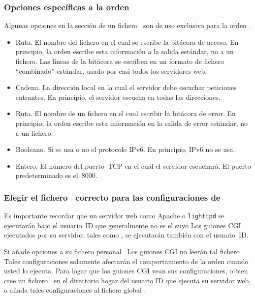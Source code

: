 \subsubsection{Opciones específicas a la orden }

Algunas opciones en la sección  de un fichero \hgrc\
son de uso exclusivo para la orden .
\begin{itemize}
\item[\rcitem{web}{accesslog}] Ruta.  El nombre del fichero en el cual
  se escribe la bitácora de acceso.  En principio, la orden
   escribe esta información a la salida estándar, no a un
  fichero. Las líneas de la bitácora se escriben en un formato de
  fichero ``combinado'' estándar, usado por casi todos los servidores
  web.
\item[\rcitem{web}{address}] Cadena.  La dirección local en la cual el
  servidor debe escuchar peticiones entrantes.  En principio, el
  servidor escucha en todas las direcciones.
\item[\rcitem{web}{errorlog}] Ruta.  El nombre de un fichero en el
  cual escribir la bitácora de error.  En principio, la orden
   escribe esta información en la salida de error
  estándar, no a un fichero.
\item[\rcitem{web}{ipv6}] Booleano.  Si se usa o no el protocolo
  IPv6. En principio, IPv6 no se usa.
\item[\rcitem{web}{port}] Entero.  El número del puerto~TCP en el cuál
  el servidor escuchará.  El puerto predeterminado es el~8000.
\end{itemize}

\subsubsection{Elegir el fichero \hgrc\ correcto para las
  configuraciones de }

Es importante recordar que un servidor web como Apache o
\texttt{lighttpd} se ejecutarán bajo el usuario~ID que generalmente no
es el suyo  Los guiones CGI ejecutados por su servidor, tales como
\sfilename{hgweb.cgi}, se ejecutarán también con el usuario~ID.

Si añade opciones  a su fichero personal \hgrc\, Los
guiones CGI no leerán tal fichero \hgrc\.  Tales configuraciones
solamente afectarán el comportamiento de la orden \hgcmd{serve} cuando
usted lo ejecuta.  Para logar que los guiones CGI vean sus
configuraciones, o bien cree un fichero \hgrc\ en el directorio hogar
del usuario ID que ejecuta su servidor web, o añada tales
configuraciones al fichero global \hgrc.



